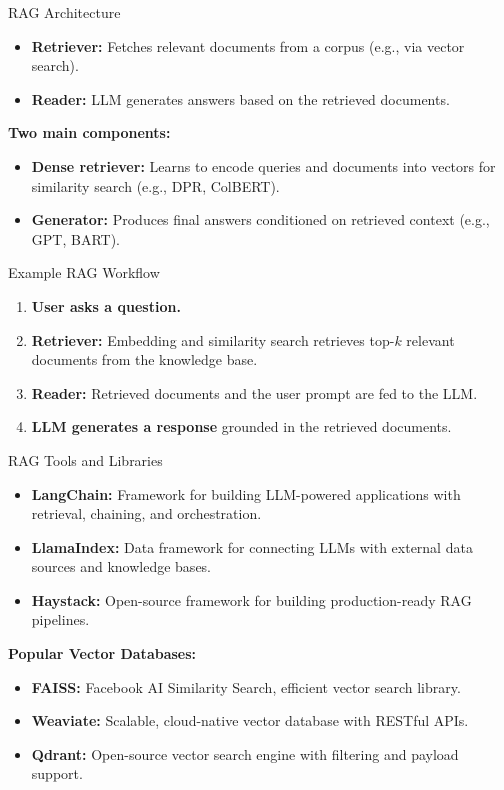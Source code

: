 \begin{frame}{RAG Architecture}
    \begin{itemize}
        \setlength{\itemsep}{1em}
        \item \textbf{Retriever:} Fetches relevant documents from a corpus (e.g., via vector search).
        \item \textbf{Reader:} LLM generates answers based on the retrieved documents.
    \end{itemize}
    \vspace{1em}
    \textbf{Two main components:}
    \begin{itemize}
        \setlength{\itemsep}{1em}
        \item \textbf{Dense retriever:} Learns to encode queries and documents into vectors for similarity search (e.g., DPR, ColBERT).
        \item \textbf{Generator:} Produces final answers conditioned on retrieved context (e.g., GPT, BART).
    \end{itemize}
\end{frame}


\begin{frame}{Example RAG Workflow}
    \begin{enumerate}
        \setlength{\itemsep}{1em}
        \item \textbf{User asks a question.}
        \item \textbf{Retriever:} Embedding and similarity search retrieves top-$k$ relevant documents from the knowledge base.
        \item \textbf{Reader:} Retrieved documents and the user prompt are fed to the LLM.
        \item \textbf{LLM generates a response} grounded in the retrieved documents.
    \end{enumerate}
\end{frame}


\begin{frame}{RAG Tools and Libraries}
    \begin{itemize}
        \setlength{\itemsep}{1em}
        \item \textbf{LangChain:} Framework for building LLM-powered applications with retrieval, chaining, and orchestration.
        \item \textbf{LlamaIndex:} Data framework for connecting LLMs with external data sources and knowledge bases.
        \item \textbf{Haystack:} Open-source framework for building production-ready RAG pipelines.
    \end{itemize}
    \vspace{1em}
    \textbf{Popular Vector Databases:}
    \begin{itemize}
        \item \textbf{FAISS:} Facebook AI Similarity Search, efficient vector search library.
        \item \textbf{Weaviate:} Scalable, cloud-native vector database with RESTful APIs.
        \item \textbf{Qdrant:} Open-source vector search engine with filtering and payload support.
    \end{itemize}
\end{frame}


